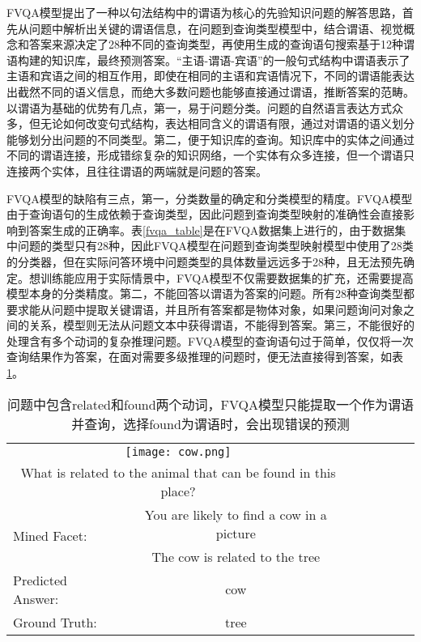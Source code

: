 FVQA模型提出了一种以句法结构中的谓语为核心的先验知识问题的解答思路，首先从问题中解析出关键的谓语信息，在问题到查询类型模型中，结合谓语、视觉概念和答案来源决定了28种不同的查询类型，再使用生成的查询语句搜索基于12种谓语构建的知识库，最终预测答案。“主语-谓语-宾语”的一般句式结构中谓语表示了主语和宾语之间的相互作用，即使在相同的主语和宾语情况下，不同的谓语能表达出截然不同的语义信息，而绝大多数问题也能够直接通过谓语，推断答案的范畴。以谓语为基础的优势有几点，第一，易于问题分类。问题的自然语言表达方式众多，但无论如何改变句式结构，表达相同含义的谓语有限，通过对谓语的语义划分能够划分出问题的不同类型。第二，便于知识库的查询。知识库中的实体之间通过不同的谓语连接，形成错综复杂的知识网络，一个实体有众多连接，但一个谓语只连接两个实体，且往往谓语的两端就是问题的答案。

FVQA模型的缺陷有三点，第一，分类数量的确定和分类模型的精度。FVQA模型由于查询语句的生成依赖于查询类型，因此问题到查询类型映射的准确性会直接影响到答案生成的正确率。表\ref{fvqa_table}是在FVQA数据集上进行的，由于数据集中问题的类型只有28种，因此FVQA模型在问题到查询类型映射模型中使用了28类的分类器，但在实际问答环境中问题类型的具体数量远远多于28种，且无法预先确定。想训练能应用于实际情景中，FVQA模型不仅需要数据集的扩充，还需要提高模型本身的分类精度。第二，不能回答以谓语为答案的问题。所有28种查询类型都要求能从问题中提取关键谓语，并且所有答案都是物体对象，如果问题询问对象之间的关系，模型则无法从问题文本中获得谓语，不能得到答案。第三，不能很好的处理含有多个动词的复杂推理问题。FVQA模型的查询语句过于简单，仅仅将一次查询结果作为答案，在面对需要多级推理的问题时，便无法直接得到答案，如表\ref{fvqa_wrong}。
\begin{table}[H]
\centering
\begin{tabular}{lcccccc}
\toprule
\multicolumn{2}{c}{\texttt{[image: cow.png]}} \\
\multicolumn{2}{c}{What is related to the animal that can be found in this place?} \\
\midrule
\multirow{2}{*}{Mined Facet:} & You are likely to find a cow in a picture \\
 & The cow is related to the tree \\
Predicted Answer: & cow \\
Ground Truth: & tree \\
\bottomrule
\end{tabular}
\caption{问题中包含related和found两个动词，FVQA模型只能提取一个作为谓语并查询，选择found为谓语时，会出现错误的预测}
\label{fvqa_wrong}
\end{table}

